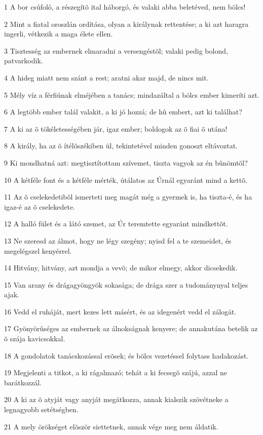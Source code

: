 \par 1 A bor csúfoló, a részegítõ ital háborgó, és valaki abba beletéved, nem bölcs!
\par 2 Mint a fiatal oroszlán ordítása, olyan a királynak rettentése; a ki azt haragra ingerli, vétkezik a maga élete ellen.
\par 3 Tisztesség az embernek elmaradni a versengéstõl; valaki pedig bolond, patvarkodik.
\par 4 A hideg miatt nem szánt a rest; aratni akar majd, de nincs mit.
\par 5 Mély víz a férfiúnak elméjében a tanács; mindazáltal a bölcs ember kimeríti azt.
\par 6 A legtöbb ember talál valakit, a ki jó hozzá; de hû embert, azt ki találhat?
\par 7 A ki az õ tökéletességében jár, igaz ember; boldogok az õ fiai õ utána!
\par 8 A király, ha az õ ítélõszékiben ül, tekintetével minden gonoszt eltávoztat.
\par 9 Ki mondhatná azt: megtisztítottam szívemet, tiszta vagyok az én bûnömtõl?
\par 10 A kétféle font és a kétféle mérték, útálatos az Úrnál egyaránt mind a kettõ.
\par 11 Az õ cselekedetibõl ismerteti meg magát még a gyermek is, ha tiszta-é, és ha igaz-é az õ cselekedete.
\par 12 A halló fület és a látó szemet, az Úr teremtette egyaránt mindkettõt.
\par 13 Ne szeresd az álmot, hogy ne légy szegény; nyisd fel a te szemeidet, és megelégszel kenyérrel.
\par 14 Hitvány, hitvány, azt mondja a vevõ; de mikor elmegy, akkor dicsekedik.
\par 15 Van arany és drágagyöngyök sokasága; de drága szer a tudománynyal teljes ajak.
\par 16 Vedd el ruháját, mert kezes lett másért, és az idegenért vedd el zálogát.
\par 17 Gyönyörûséges az embernek az álnokságnak kenyere; de annakutána betelik az õ szája kavicsokkal.
\par 18 A gondolatok tanácskozással erõsek; és bölcs vezetéssel folytass  hadakozást.
\par 19 Megjelenti a titkot, a ki rágalmazó; tehát a ki fecsegõ szájú, azzal ne barátkozzál.
\par 20 A ki az õ atyját vagy anyját megátkozza, annak kialszik szövétneke a legnagyobb setétségben.
\par 21 A mely örökséget elõször siettetnek, annak vége meg nem áldatik.
